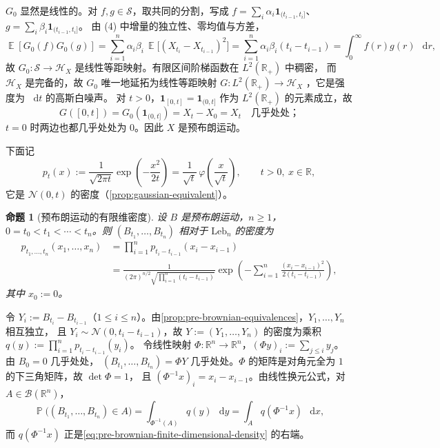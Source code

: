 \documentclass[UTF8,11pt,a4paper,oneside,fontset=fandol]{ctexrep}
\makeatletter
\numberwithin{equation}{section}
\theoremstyle{zhthm}
\newtheorem{proposition}[theorem]{命题}
\renewenvironment{proof}[1][\proofname]{\par
  \pushQED{\qed}%
  \normalfont\topsep6\p@\@plus6\p@\relax
  \trivlist
  \item[\hskip\labelsep\bfseries#1\hspace{0.5em}]\ignorespaces
}{%
  \popQED\endtrivlist\@endpefalse
}
\renewcommand{\proofname}{证明}
\newcommand{\R}{\mathbb{R}}
\newcommand{\B}{\mathcal{B}}
\newcommand{\Hcal}{\mathcal{H}}
\DeclareMathOperator{\Prob}{\mathbb{P}}
\DeclareMathOperator{\E}{\mathbb{E}}
\newcommand{\Leb}{\mathrm{Leb}}
\newcommand{\Normal}{\mathcal{N}}
\newcommand{\ind}[1]{\mathbf{1}_{#1}}
\newcommand{\dd}{\mathop{}\!\mathrm{d}}
\makeatother
\begin{document}
\begin{proof}
$G_0$ 显然是线性的。对 $f,g\in\mathcal S$，取共同的分割，写成
$f=\sum_i\alpha_i\ind{(t_{i-1},t_i]}$、$g=\sum_i\beta_i\ind{(t_{i-1},t_i]}$。
由 (4) 中增量的独立性、零均值与方差，
\[
  \E[G_0(f)G_0(g)]=\sum_{i=1}^{n}\alpha_i\beta_i\,\E\bigl[(X_{t_i}-X_{t_{i-1}})^2\bigr]
  =\sum_{i=1}^{n}\alpha_i\beta_i(t_i-t_{i-1})=\int_0^\infty f(r)g(r)\,\dd r,
\]
故 $G_0:\mathcal S\to\Hcal_X$ 是线性等距映射。有限区间阶梯函数在 $L^2(\R_+)$ 中稠密，
而 $\Hcal_X$ 是完备的，故 $G_0$ 唯一地延拓为线性等距映射 $G:L^2(\R_+)\to\Hcal_X$
\cite[\S1.3，第 7--8 页]{Nualart2018}，它是强度为 $\dd t$ 的高斯白噪声。
对 $t>0$，$\ind{[0,t]}=\ind{(0,t]}$ 作为 $L^2(\R_+)$ 的元素成立，故
\[
  G([0,t])=G_0(\ind{(0,t]})=X_t-X_0=X_t\quad\text{几乎处处；}
\]
$t=0$ 时两边也都几乎处处为 $0$。因此 $X$ 是预布朗运动。
\end{proof}

下面记
\[
  p_t(x):=\frac{1}{\sqrt{2\pi t}}\exp\!\left(-\frac{x^2}{2t}\right)=\frac{1}{\sqrt t}\,\varphi\!\left(\frac{x}{\sqrt t}\right),
  \qquad t>0,\ x\in\R,
\]
它是 $\Normal(0,t)$ 的密度（\cref{prop:gaussian-equivalent}）。

\begin{proposition}[预布朗运动的有限维密度]
\label{prop:pre-brownian-finite-dimensional-density}
设 $B$ 是预布朗运动，$n\ge1$，$0=t_0<t_1<\cdots<t_n$。则 $(B_{t_1},\ldots,B_{t_n})$ 相对于 $\Leb_n$ 的密度为
\begin{equation}
  \label{eq:pre-brownian-finite-dimensional-density}
  \begin{split}
    p_{t_1,\ldots,t_n}(x_1,\ldots,x_n)
    &=\prod_{i=1}^{n}p_{t_i-t_{i-1}}(x_i-x_{i-1})\\
    &=\frac{1}{(2\pi)^{n/2}\sqrt{\prod_{i=1}^{n}(t_i-t_{i-1})}}
      \exp\!\left(-\sum_{i=1}^{n}\frac{(x_i-x_{i-1})^2}{2(t_i-t_{i-1})}\right),
  \end{split}
\end{equation}
其中 $x_0:=0$。
\end{proposition}

\begin{proof}
令 $Y_i:=B_{t_i}-B_{t_{i-1}}$（$1\le i\le n$）。由\cref{prop:pre-brownian-equivalences}，$Y_1,\ldots,Y_n$ 相互独立，
且 $Y_i\sim\Normal(0,t_i-t_{i-1})$，故 $Y:=(Y_1,\ldots,Y_n)$ 的密度为乘积 $q(y):=\prod_{i=1}^{n}p_{t_i-t_{i-1}}(y_i)$。
令线性映射 $\Phi:\R^n\to\R^n$，$(\Phi y)_i:=\sum_{j\le i}y_j$。由 $B_0=0$ 几乎处处，
$(B_{t_1},\ldots,B_{t_n})=\Phi Y$ 几乎处处。$\Phi$ 的矩阵是对角元全为 $1$ 的下三角矩阵，故 $\det\Phi=1$，
且 $(\Phi^{-1}x)_i=x_i-x_{i-1}$。由线性换元公式\cite[练习 1.3.16，第 66 页]{Tao2011}，对 $A\in\B(\R^n)$，
\[
  \Prob\bigl((B_{t_1},\ldots,B_{t_n})\in A\bigr)=\int_{\Phi^{-1}(A)}q(y)\,\dd y=\int_Aq(\Phi^{-1}x)\,\dd x,
\]
而 $q(\Phi^{-1}x)$ 正是\cref{eq:pre-brownian-finite-dimensional-density} 的右端。
\end{proof}
\end{document}

